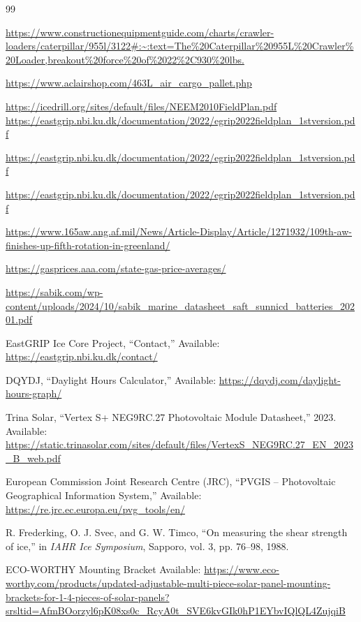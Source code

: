 \documentclass[11pt,a4paper]{article}
\begin{document}
\begin{thebibliography}{99}

 \url{https://www.constructionequipmentguide.com/charts/crawler-loaders/caterpillar/955l/3122#:~:text=The%20Caterpillar%20955L%20Crawler%20Loader,breakout%20force%20of%2022%2C930%20lbs.}

 \url{https://www.aclairshop.com/463L_air_cargo_pallet.php}

 \url{https://icedrill.org/sites/default/files/NEEM2010FieldPlan.pdf https://eastgrip.nbi.ku.dk/documentation/2022/egrip2022fieldplan_1stversion.pdf}

 \url{https://eastgrip.nbi.ku.dk/documentation/2022/egrip2022fieldplan_1stversion.pdf}

 \url{https://eastgrip.nbi.ku.dk/documentation/2022/egrip2022fieldplan_1stversion.pdf}

\url{https://www.165aw.ang.af.mil/News/Article-Display/Article/1271932/109th-aw-finishes-up-fifth-rotation-in-greenland/}

 \url{https://gasprices.aaa.com/state-gas-price-averages/}

 \url{https://sabik.com/wp-content/uploads/2024/10/sabik_marine_datasheet_saft_sunnicd_batteries_20201.pdf}

EastGRIP Ice Core Project, “Contact,” Available: \url{https://eastgrip.nbi.ku.dk/contact/}

DQYDJ, “Daylight Hours Calculator,” Available: \url{https://dqydj.com/daylight-hours-graph/}

Trina Solar, “Vertex S+ NEG9RC.27 Photovoltaic Module Datasheet,” 2023. Available: \url{https://static.trinasolar.com/sites/default/files/VertexS_NEG9RC.27_EN_2023_B_web.pdf}

European Commission Joint Research Centre (JRC), “PVGIS – Photovoltaic Geographical Information System,” Available: \url{https://re.jrc.ec.europa.eu/pvg_tools/en/}

R. Frederking, O. J. Svec, and G. W. Timco, “On measuring the shear strength of ice,” in \textit{IAHR Ice Symposium}, Sapporo, vol. 3, pp. 76–98, 1988.

ECO-WORTHY Mounting Bracket Available: \url{https://www.eco-worthy.com/products/updated-adjustable-multi-piece-solar-panel-mounting-brackets-for-1-4-pieces-of-solar-panels?srsltid=AfmBOorzyl6pK08xs0c_RcyA0t_SVE6kvGIk0hP1EYbvIQlQL4ZujqiB}




\end{thebibliography}
\end{document}
